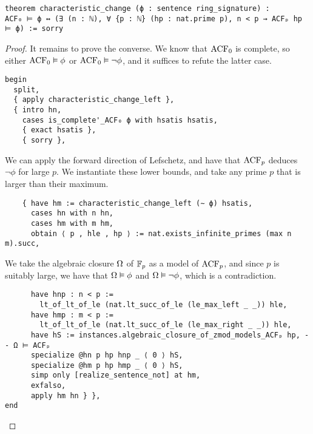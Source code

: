 \begin{lstlisting}
theorem characteristic_change (ϕ : sentence ring_signature) :
ACF₀ ⊨ ϕ ↔ (∃ (n : ℕ), ∀ {p : ℕ} (hp : nat.prime p), n < p → ACFₚ hp ⊨ ϕ) := sorry \end{lstlisting}
\begin{proof}
It remains to prove the converse.
We know that $\operatorname{ACF}_{0}$ is complete,
so either $\operatorname{ACF}_{0} \vDash \phi$ or $\operatorname{ACF}_{0} \vDash \neg \phi$,
and it suffices to refute the latter case.

\begin{lstlisting}
begin
  split,
  { apply characteristic_change_left },
  { intro hn,
    cases is_complete'_ACF₀ ϕ with hsatis hsatis,
    { exact hsatis },
    { sorry }, \end{lstlisting}

We can apply the forward direction of Lefschetz,
and have that $\operatorname{ACF}_{p}$ deduces $\neg \phi$ for large $p$.
We instantiate these lower bounds, and take any prime $p$ that is larger
than their maximum.

\begin{lstlisting}
    { have hm := characteristic_change_left (∼ ϕ) hsatis,
      cases hn with n hn,
      cases hm with m hm,
      obtain ⟨ p , hle , hp ⟩ := nat.exists_infinite_primes (max n m).succ, \end{lstlisting}

We take the algebraic closure $\Omega$ of $\mathbb{F}_{p}$ as a model of $\operatorname{ACF}_{p}$,
and since $p$ is suitably large, we have that $\Omega \vDash \phi$ and
$\Omega \vDash \neg \phi$, which is a contradiction.

\begin{lstlisting}
      have hnp : n < p :=
        lt_of_lt_of_le (nat.lt_succ_of_le (le_max_left _ _)) hle,
      have hmp : m < p :=
        lt_of_lt_of_le (nat.lt_succ_of_le (le_max_right _ _)) hle,
      have hS := instances.algebraic_closure_of_zmod_models_ACFₚ hp, -- Ω ⊨ ACFₚ
      specialize @hn p hp hnp _ ⟨ 0 ⟩ hS,
      specialize @hm p hp hmp _ ⟨ 0 ⟩ hS,
      simp only [realize_sentence_not] at hm,
      exfalso,
      apply hm hn } },
end \end{lstlisting}

\end{proof}
